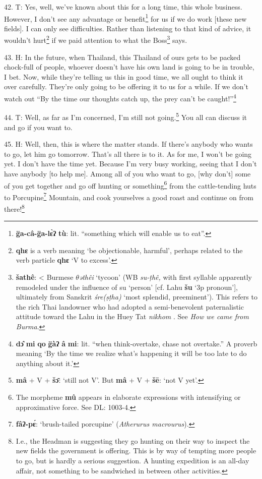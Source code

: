 42. T: Yes, well, we've known about this for a long time, this whole business.
However, I don't see any advantage or benefit\footnote{\textbf{g̈a-câ-g̈a-lɛ̀ʔ} \textbf{tù}: lit. ``something which will enable us to eat''.} for us if we do work [these new
fields]. I can only see difficulties. Rather than listening to that kind of advice,
it wouldn't hurt\footnote{\textbf{qhɛ} is a verb meaning `be objectionable, harmful', perhaps related to the verb particle \textbf{qhɛ} `V to excess'.} if we paid attention to what the Boss\footnote{\textbf{šathê}: < Burmese \textit{$\theta$əthêi}  `tycoon' (WB \textit{su-ṭhê,} with first syllable apparently remodeled under the influence of su `person' [cf. Lahu \textbf{šu} `3p pronoun'], ultimately from Sanskrit \textit{śre(ṣṭha)}  `most splendid, preeminent'). This refers to the rich Thai landowner who had adopted a semi-benevolent paternalistic attitude toward the Lahu in the Huey Tat \textit{nikhom} . See \textit{How we came from Burma}.} says.

43. H: In the future, when Thailand, this Thailand of ours gets to be packed chock-full
of people, whoever doesn't have his own land is going to be in trouble, I bet.
Now, while they're telling us this in good time, we all ought to think it over
carefully. They're only going to be offering it to us for a while. If we don't
watch out ``By the time our thoughts catch up, the prey can't be caught!''\footnote{\textbf{dɔ̂} \textbf{mi} \textbf{qo} \textbf{g̈àʔ} \textbf{â} \textbf{mi}: lit. ``when think-overtake, chase not overtake.'' A proverb meaning `By the time we realize what's happening it will be too late to do anything about it.'}

44. T: Well, as far as I'm concerned, I'm still not going.\footnote{\textbf{mâ} + V + \textbf{šɔ̄}: `still not V'. But \textbf{mâ} + V + \textbf{šē}: `not V yet'.} You all can
discuss it and go if you want to.

45. H: Well, then, this is where the matter stands. If there's anybody who wants
to go, let him go tomorrow. That's all there is to it. As for me, I won't be going
yet. I don't have the time yet. Because I'm very busy working, seeing that I don't
have anybody [to help me]. Among all of you who want to go, [why don't] some of
you get together and go off hunting or something\footnote{The morpheme \textbf{mû} appears in elaborate expressions with intensifying or approximative force. See DL: 1003-4.} from the cattle-tending huts
to Porcupine\footnote{\textbf{fâʔ-pɛ́}: `brush-tailed porcupine' (\textit{Atherurus macrourus}).} Mountain, and cook yourselves a good roast and continue on from
there!\footnote{I.e., the Headman is suggesting they go hunting on their way to inspect the new fields the government is offering. This is by way of tempting more people to go, but is hardly a serious suggestion. A hunting expedition is an all-day affair, not something to be sandwiched in between other activities.}

